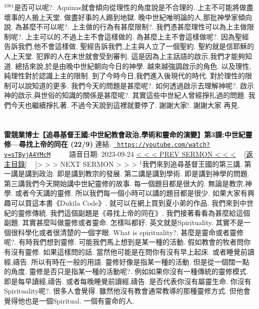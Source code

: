 \documentclass{book}
\begin{document}
$^{1081}$是否可以呢?.
Aquinas就會傾向從理性的角度說是不合理的.
上主不可能將做盡壞事的人搬上天堂.
做盡好事的人踢到地獄.
晚中世紀唯明論的人,那批神學家傾向說.
為甚麼不可以呢?.
上主做的行為有甚麼限制?.
我們憑甚麼理性可以為上主做限制呢?.
上主可以的,不過上主不會這樣做的.
為甚麼上主不會這樣做呢?.
因為聖經告訴我們,他不會這樣做.
聖經告訴我們,上主與人立了一個聖約.
聖約就是信耶穌的人上天堂.
犯罪的人在末世就會受到審判.
這是因為上主話語的啟示,我們才能夠知道.
總括來說,於是由晚中世紀朝向今日的神學.
越來越強調啟示的角色.
以及理性,純理性對於認識上主的限制.
到了今時今日,我們進入後現代的時代.
對於理性的限制可以說知道的更多.
我們今天的問題是甚麼呢?.
如何透過啟示去理解神呢?.
啟示神的啟示,與世俗的知識的關係是甚麼呢?.
其實這些中世紀人曾經掙扎過的問題.
我們今天也繼續掙扎著.
不過今天說到這裡就要停了.
謝謝大家!.
謝謝大家 再見.
\newpage



\section{}
\label{sec:sTByjA4YMcM}
\textbf{雷競業博士【追尋基督王國:中世紀教會政治,學術和靈命的演變】第3課:中世紀靈修—尋找上帝的同在 (22/9)}
\newline
\newline
連結: \href{https://youtube.com/watch?v=sTByjA4YMcM}{\texttt{ https://youtube.com/watch?v=sTByjA4YMcM}} ~~~~ 語音日期: 2023-09-24 
\newline
\newline
\hyperref[sec:cveuS8m2O7k]{\small{< < < PREV SERMON < < <}}
~
\hyperref[sec:index]{\small{[返主目錄]}}
~
\hyperref[sec:nPtT6PycYE]]{\small{> > > NEXT SERMON > > >}}
\newline
\newline
$^{1}$我們來到追尋基督王國的第三講.
第一講是講到政治.
即是講到教宗的發展.
第二講是講到學術.
即是講到神學的問題.
第三講我們今天開始講中世紀靈修的故事.
每一個題目都是很大的.
無論是教宗,神學.
或者今天講的靈修.
所以我們每一個小時可以講的題目都是很少.
如果大家有興趣可以買這本書《Dukila Code》.
就可以在網上買到夏小弟的作品.
我們來到中世紀的靈修傳統.
我們這個副題是《尋找上帝的同在》.
我們接著看看為甚麼給這個副題.
其實甚麼叫做靈修或者靈命.
怎樣叫都好.
英文就是Spirituality.
其實不是一個很科學化或者很清楚的一個字眼.
What is spirituality?.
甚麼是靈命或者靈修呢?.
有時我們想到靈修.
可能我們馬上想到是某一種的活動.
假如教會的牧者問你有沒有靈修.
如果這樣問的話.
當然他可能是在問你有沒有早上起床.
或者睡覺前讀經,禱告.
所以有時在一般的用語.
靈修好像是指某一種的活動.
但是從一個闊一點的角度.
靈修是否只是指某一種的活動呢?.
例如如果你沒有一種傳統的靈修模式.
即是每早讀經,禱告.
或者每晚睡覺前讀經,禱告.
是否代表你沒有屬靈生命.
你沒有Spirituality呢?.
很多人會覺得.
雖然他沒有教會通常教導的那種靈修方式.
但他會覺得他也是一個Spiritual.
一個有靈命的人.
\end{document}
